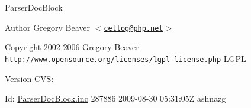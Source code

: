 {\bfseries {\itshape {\ttfamily   \-Parser\-Doc\-Block \begin{DoxyAuthor}{\-Author}
\-Gregory \-Beaver $<$\href{mailto:cellog@php.net}{\tt cellog@php.\-net}$>$ 
\end{DoxyAuthor}
\begin{DoxyCopyright}{\-Copyright}
2002-\/2006 \-Gregory \-Beaver  \href{http://www.opensource.org/licenses/lgpl-license.php}{\tt http\-://www.\-opensource.\-org/licenses/lgpl-\/license.\-php} \-L\-G\-P\-L 
\end{DoxyCopyright}
\begin{DoxyVersion}{\-Version}
\-C\-V\-S\-: 
\end{DoxyVersion}
\begin{DoxyParagraph}{\-Id\-:}
\hyperlink{_parser_doc_block_8inc}{\-Parser\-Doc\-Block.\-inc} 287886 2009-\/08-\/30 05\-:31\-:05\-Z ashnazg 
\end{DoxyParagraph}
}}}
